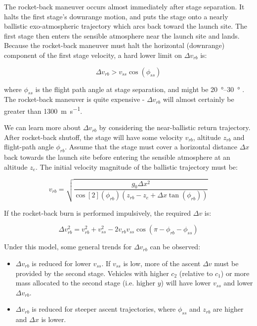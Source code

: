 \documentclass[conf]{new-aiaa}
\begin{document}
The rocket-back maneuver occurs almost immediately after stage separation. It halts the first stage's downrange motion, and puts the stage onto a nearly ballistic exo-atmospheric trajectory which arcs back toward the launch site. The first stage then enters the sensible atmosphere near the launch site and lands. Because the rocket-back maneuver must halt the horizontal (downrange) component of the first stage velocity, a hard lower limit on $\Delta v_{rb}$ is:

\begin{equation}
\Delta v_{rb} > v_{ss} \cos(\phi_{ss})
\end{equation}

where $\phi_{ss}$ is the flight path angle at stage separation, and might be \SIrange{20}{30}{\degree} \cite{McKinney1986}. The rocket-back maneuver is quite expensive - $\Delta v_{rb}$ will almost certainly be greater than \SI{1300}{\meter\per\second}.

We can learn more about $\Delta v_{rb}$ by considering the near-ballistic return trajectory. After rocket-back shutoff, the stage will have some velocity $v_{rb}$, altitude $z_{rb}$ and flight-path angle $\phi_{rb}$. Assume that the stage must cover a horizontal distance $\Delta x$ back towards the launch site before entering the sensible atmosphere at an altitude $z_e$. The initial velocity magnitude of the ballistic trajectory must be:

\begin{equation}
\label{eq:rocketback_velocity}
v_{rb} = \sqrt{\frac{g_0 \Delta x^2}{\cos[2](\phi_{rb})(z_{rb} - z_{e} + \Delta x \tan(\phi_{rb}))} }
\end{equation}

If the rocket-back burn is performed impulsively, the required $\Delta v$ is:

\begin{equation}
\label{eq:rocketback_dv}
\Delta v_{rb}^2 = v_{rb}^2 + v_{ss}^2 - 2 v_{rb} v_{ss} \cos(\pi - \phi_{rb} - \phi_{ss})
\end{equation}

Under this model, some general trends for $\Delta v_{rb}$ can be observed:
\begin{itemize}
	\item $\Delta v_{rb}$ is reduced for lower $v_{ss}$. If $v_{ss}$ is low, more of the ascent $\Delta v$ must be provided by the second stage. Vehicles with higher $c_2$ (relative to $c_1$) or more mass allocated to the second stage (i.e. higher $y$) will have lower $v_{ss}$ and lower $\Delta v_{rb}$.
	\item $\Delta v_{rb}$ is reduced for steeper ascent trajectories, where $\phi_{ss}$ and $z_{rb}$ are higher and $\Delta x$ is lower.
\end{itemize}
\end{document}
